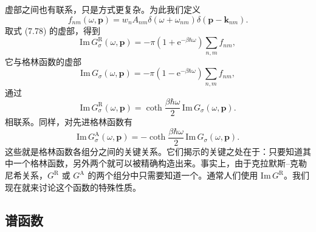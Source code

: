 虚部之间也有联系，只是方式更复杂。为此我们定义
\begin{equation*}
f_{nm}(\omega,\mathbf{p})=w_{n}A_{nm}\delta(\omega+\omega_{nm})\delta(\mathbf{p}-\mathbf{k}_{nm}).\tag{7.82}
\end{equation*}
取式 (7.78) 的虚部，得到
\begin{equation*}
\mathrm{Im}\,G_{\sigma}^{\mathrm{R}}(\omega,\mathbf{p})=-\pi\left(1+\mathrm{e}^{-\beta\hbar\omega}\right)\sum_{n,m}f_{nm},\tag{7.83}
\end{equation*}
它与格林函数的虚部
\begin{equation*}
\mathrm{Im}\,G_{\sigma}(\omega,\mathbf{p})=-\pi\left(1-\mathrm{e}^{-\beta\hbar\omega}\right)\sum_{n,m}f_{nm},\tag{7.84}
\end{equation*}
通过
\begin{equation*}
\mathrm{Im}\,G_{\sigma}^{\mathrm{R}}(\omega,\mathbf{p})=\coth\frac{\beta\hbar\omega}{2}\,\mathrm{Im}\,G_{\sigma}(\omega,\mathbf{p}).\tag{7.85}
\end{equation*}
相联系。同样，对先进格林函数有
\begin{equation*}
\mathrm{Im}\,G_{\sigma}^{\mathrm{A}}(\omega,\mathbf{p})=-\coth\frac{\beta\hbar\omega}{2}\,\mathrm{Im}\,G_{\sigma}(\omega,\mathbf{p}).\tag{7.86}
\end{equation*}
这些就是格林函数各组分之间的关键关系。它们揭示的关键之处在于：只要知道其中一个格林函数，另外两个就可以被精确构造出来。事实上，由于克拉默斯–克勒尼希关系，$G^{\mathrm{R}}$ 或 $G^{\mathrm{A}}$ 的两个组分中只需要知道一个。通常人们使用 $\mathrm{Im}\,G^{\mathrm{R}}$。我们现在就来讨论这个函数的特殊性质。

\subsection*{谱函数}


